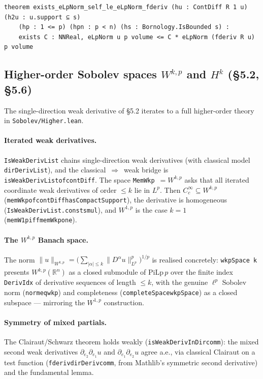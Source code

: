 ﻿\documentclass[12pt, a4paper]{article}
\renewcommand{\_}{\origunderscore\allowbreak}
\theoremstyle{definition}
\theoremstyle{plain}
\begin{document}
\begin{lstlisting}[caption={Poincare inequality, W^{1,p}_0 form (proved, zero sorry)}]
theorem exists_eLpNorm_self_le_eLpNorm_fderiv (hu : ContDiff R 1 u) (h2u : u.support ⊆ s)
    (hp : 1 <= p) (hpn : p < n) (hs : Bornology.IsBounded s) :
    exists C : NNReal, eLpNorm u p volume <= C * eLpNorm (fderiv R u) p volume
\end{lstlisting}

\subsection{Higher-order Sobolev spaces $W^{k,p}$ and $H^k$ (§5.2, §5.6)}

The single-direction weak derivative of §5.2 iterates to a full higher-order theory in
\texttt{Sobolev/\allowbreak Higher.\allowbreak lean}.

\paragraph{Iterated weak derivatives.}  \texttt{IsWeakDerivList} chains single-direction weak
derivatives (with classical model \texttt{dirDerivList}), and the classical~$\Rightarrow$~weak bridge
is \texttt{isWeakDerivList\_of\_contDiff}.  The space \texttt{MemWkp}~$=W^{k,p}$ asks that all iterated
coordinate weak derivatives of order $\le k$ lie in $L^p$.  Then $C^\infty_c\subseteq W^{k,p}$
(\texttt{memWkp\_of\_contDiff\_hasCompactSupport}), the derivative is homogeneous
(\texttt{IsWeakDerivList.const\_smul}), and $W^{1,p}$ is the case $k=1$
(\texttt{memW1p\_iff\_memWkp\_one}).

\paragraph{The $W^{k,p}$ Banach space.}  The norm
$\|u\|_{W^{k,p}}=\bigl(\sum_{|\alpha|\le k}\|D^\alpha u\|_{L^p}^p\bigr)^{1/p}$ is realised concretely:
\texttt{wkpSpace k} presents $W^{k,p}(\mathbb{R}^n)$ as a closed submodule of $\mathrm{PiLp}\,p$ over
the finite index \texttt{DerivIdx} of derivative sequences of length $\le k$, with the genuine $\ell^p$
Sobolev norm (\texttt{norm\_eq\_wkp}) and completeness (\texttt{completeSpace\_wkpSpace}) as a closed
subspace --- mirroring the $W^{1,p}$ construction.

\paragraph{Symmetry of mixed partials.}  The Clairaut/Schwarz theorem holds weakly
(\texttt{isWeakDerivInDir\_comm}): the mixed second weak derivatives $\partial_{e_2}\partial_{e_1}u$ and
$\partial_{e_1}\partial_{e_2}u$ agree a.e., via classical Clairaut on a test function
(\texttt{fderiv\_dirDeriv\_comm}, from Mathlib's symmetric second derivative) and the fundamental lemma.
\end{document}
